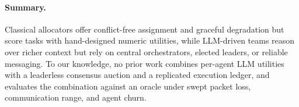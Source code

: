 \documentclass[letterpaper]{article}
\begin{document}
\paragraph{Summary.}
Classical allocators offer conflict-free assignment and graceful degradation but score tasks with hand-designed numeric utilities, while LLM-driven teams reason over richer context but rely on central orchestrators, elected leaders, or reliable messaging. To our knowledge, no prior work combines per-agent LLM utilities with a leaderless consensus auction and a replicated execution ledger, and evaluates the combination against an oracle under swept packet loss, communication range, and agent churn.


\end{document}
